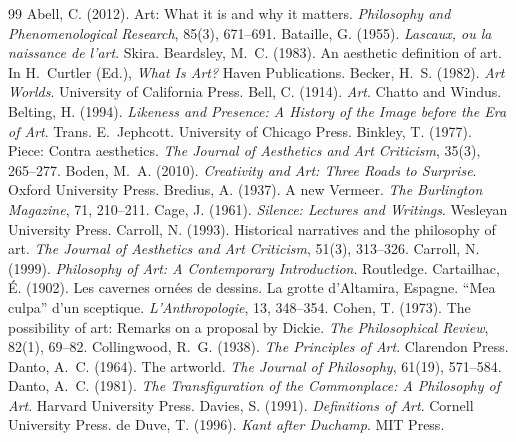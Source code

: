 \documentclass{situationist-preprint}
\begin{document}
\begin{thebibliography}{99}\small
{} Abell, C. (2012). Art: What it is and why it matters. \emph{Philosophy and Phenomenological Research}, 85(3), 671--691.
 Bataille, G. (1955). \emph{Lascaux, ou la naissance de l'art}. Skira.
 Beardsley, M.~C. (1983). An aesthetic definition of art. In H.~Curtler (Ed.), \emph{What Is Art?} Haven Publications.
 Becker, H.~S. (1982). \emph{Art Worlds}. University of California Press.
 Bell, C. (1914). \emph{Art}. Chatto and Windus.
 Belting, H. (1994). \emph{Likeness and Presence: A History of the Image before the Era of Art}. Trans. E.~Jephcott. University of Chicago Press.
 Binkley, T. (1977). Piece: Contra aesthetics. \emph{The Journal of Aesthetics and Art Criticism}, 35(3), 265--277.
 Boden, M.~A. (2010). \emph{Creativity and Art: Three Roads to Surprise}. Oxford University Press.
 Bredius, A. (1937). A new Vermeer. \emph{The Burlington Magazine}, 71, 210--211.
 Cage, J. (1961). \emph{Silence: Lectures and Writings}. Wesleyan University Press.
 Carroll, N. (1993). Historical narratives and the philosophy of art. \emph{The Journal of Aesthetics and Art Criticism}, 51(3), 313--326.
 Carroll, N. (1999). \emph{Philosophy of Art: A Contemporary Introduction}. Routledge.
 Cartailhac, \'E. (1902). Les cavernes orn\'ees de dessins. La grotte d'Altamira, Espagne. \enquote{Mea culpa} d'un sceptique. \emph{L'Anthropologie}, 13, 348--354.
 Cohen, T. (1973). The possibility of art: Remarks on a proposal by Dickie. \emph{The Philosophical Review}, 82(1), 69--82.
 Collingwood, R.~G. (1938). \emph{The Principles of Art}. Clarendon Press.
 Danto, A.~C. (1964). The artworld. \emph{The Journal of Philosophy}, 61(19), 571--584.
 Danto, A.~C. (1981). \emph{The Transfiguration of the Commonplace: A Philosophy of Art}. Harvard University Press.
 Davies, S. (1991). \emph{Definitions of Art}. Cornell University Press.
 de Duve, T. (1996). \emph{Kant after Duchamp}. MIT Press.

\end{thebibliography}
\end{document}
